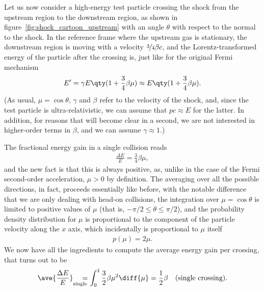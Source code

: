 \begin{marginfigure}
  
  \caption{Schematic view of a parallel shock in the reference frame where the
  velocity distribution for the upstream gas is isotropic.}
  \label{fig:shock_cartoon_upstream}
\end{marginfigure}

Let us now consider a high-energy test particle crossing the shock from the upstream
region to the downstream region, as shown in figure~\ref{fig:shock_cartoon_upstream}
with an angle $\theta$ with respect to the normal to the shock. In the reference
frame where the upstream gas is stationary, the downstream region is moving with
a velocity $\nicefrac{3}{4} \beta c$, and the Lorentz-transformed energy of the
particle after the crossing is, just like for the original Fermi mechanism
\begin{align*}
  E' = \gamma E \qty(1 + \frac{3}{4}\beta \mu) \approx
  E \qty(1 + \frac{3}{4}\beta \mu).
\end{align*}
(As usual, $\mu = \cos\theta$, $\gamma$ and $\beta$ refer to the velocity of the shock,
and, since the test particle is ultra-relativistic, we can assume that $pc \approx E$
for the latter. In addition, for reasons that will become clear in a second, we
are not interested in higher-order terms in $\beta$, and we can assume $\gamma \approx 1$.)

The fractional energy gain in a single collision reads
\begin{align*}
  \frac{\Delta E}{E} = \frac{3}{4} \beta \mu,
\end{align*}
and the new fact is that this is always positive, as, unlike in the case of the
Fermi second-order acceleration, $\mu > 0$ by definition. The averaging over
all the possible directions, in fact, proceeds essentially like before, with the
notable difference that we are only dealing with head-on collisions, the integration
over $\mu = \cos\theta$ is limited to positive values of $\mu$ (that is,
$-\pi/2 \leq \theta \leq \pi/2$), and the probability density distribution for $\mu$
is proportional to the component of the particle velocity along the $x$ axis,
which incidentally is proportional to $\mu$ itself
\begin{align*}
  p(\mu) = 2 \mu.
\end{align*}
We now have all the ingredients to compute the average energy gain per crossing, that
turns out to be
\begin{align}
  \ave{\frac{\Delta E}{E}}_\text{single} \!\!\!\!\!\! =
  \int_0^{1} \frac{3}{2} \beta \mu^2 \diff{\mu} =
  \frac{1}{2} \beta \quad\text{(single crossing)}.
\end{align}

